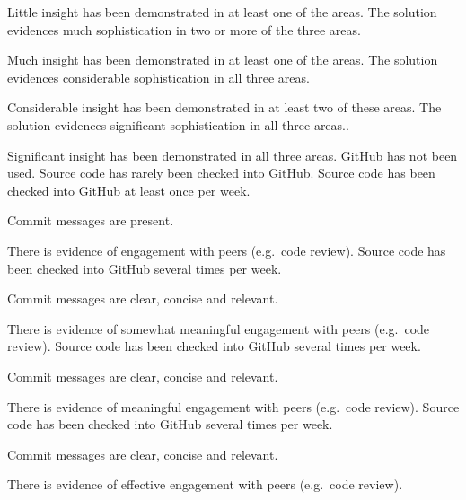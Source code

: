 \documentclass{../fal_assignment}
\begin{document}
\begin{markingrubric}
            \par Little insight has been demonstrated in at least one of the areas.
        \grade The solution evidences much sophistication in two or more of the three areas.
            \par Much insight has been demonstrated in at least one of the areas.
        \grade The solution evidences considerable sophistication in all three areas.
            \par Considerable insight has been demonstrated in at least two of these areas.
        \grade The solution evidences significant sophistication in all three areas..
            \par Significant insight has been demonstrated in all three areas.
%            
        \grade\fail GitHub has not been used.
        \grade Source code has rarely been checked into GitHub.
        \grade Source code  has been checked into GitHub at least once per week.
            \par Commit messages are present.
            \par There is evidence of engagement with peers (e.g.\ code review).
        \grade Source code  has been checked into GitHub several times per week.
            \par Commit messages are clear, concise and relevant.
            \par There is evidence of somewhat meaningful engagement with peers (e.g.\ code review).
        \grade Source code has been checked into GitHub several times per week.
            \par Commit messages are clear, concise and relevant.
            \par There is evidence of meaningful engagement with peers (e.g.\ code review).
        \grade Source code has been checked into GitHub several times per week.
            \par Commit messages are clear, concise and relevant.
            \par There is evidence of effective engagement with peers (e.g.\ code review).
%
		
\end{markingrubric}
\end{document}
